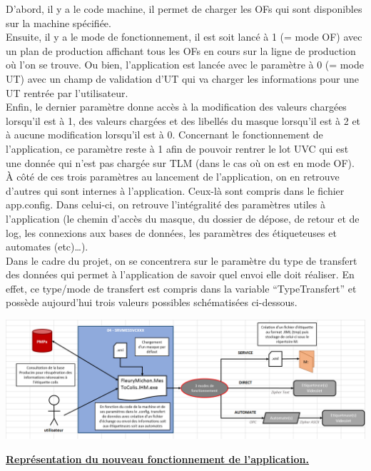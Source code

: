 \documentclass[a4paper,12pt]{extarticle}
\newcommand{\espace}{\vspace{0.3cm}}
\begin{document}
D'abord, il y a le code machine, il permet de charger les OFs qui sont disponibles sur la machine spécifiée.\\
Ensuite, il y a le mode de fonctionnement, il est soit lancé à 1 (= mode OF) avec un plan de production affichant tous les OFs en cours sur la ligne de production où l’on se trouve. Ou bien, l’application est lancée avec le paramètre à 0 (= mode UT) avec un champ de validation d’UT qui va charger les informations pour une UT rentrée par l’utilisateur.\\
Enfin, le dernier paramètre donne accès à la modification des valeurs chargées lorsqu’il est à 1, des valeurs chargées et des libellés du masque lorsqu’il est à 2 et à aucune modification lorsqu’il est à 0. Concernant le fonctionnement de l’application, ce paramètre reste à 1 afin de pouvoir rentrer le lot UVC qui est une donnée qui n’est pas chargée sur TLM (dans le cas où on est en mode OF).\\
À côté de ces trois paramètres au lancement de l’application, on en retrouve d’autres qui sont internes à l’application. Ceux-là sont compris dans le fichier app.config. Dans celui-ci, on retrouve l’intégralité des paramètres utiles à l’application (le chemin d’accès du masque, du dossier de dépose, de retour et de log, les connexions aux bases de données, les paramètres des étiqueteuses et automates (etc)…).\\
Dans le cadre du projet, on se concentrera sur le paramètre du type de transfert des données qui permet à l’application de savoir quel envoi elle doit réaliser. En effet, ce type/mode de transfert est compris dans la variable “TypeTransfert” et possède aujourd’hui trois valeurs possibles schématisées ci-dessous.\\

\centerline{\includegraphics[scale=0.45]{Img/Img_RepresentationProjet.PNG}}
\centerline{\textbf{\underline{Représentation du nouveau fonctionnement de l’application.}}}
\espace{}
\end{document}
